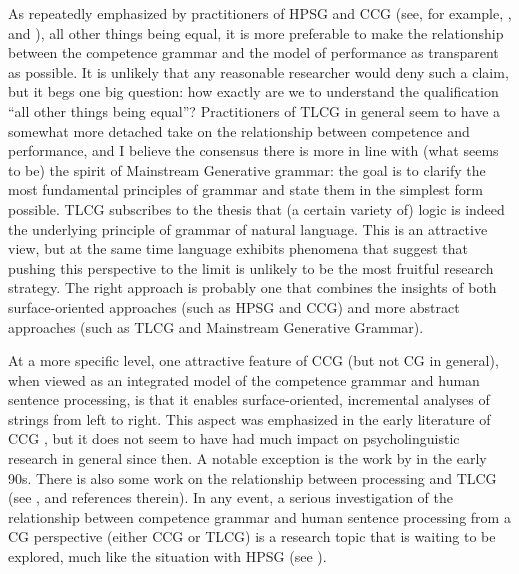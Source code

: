 \documentclass[output=paper,biblatex,babelshorthands,newtxmath,draftmode,colorlinks,citecolor=brown]{langscibook}
\begin{document}
As repeatedly emphasized by practitioners of HPSG and CCG (see, for
example, \citealt{SW2011a}, \citealt[Section~13.7]{steedman2012} and
), all other things being equal, it is more
preferable to make the relationship between the competence grammar and
the model of performance as transparent as possible. It is
unlikely that any reasonable
researcher would deny such a claim, but it begs one big question:
how exactly are we to understand the qualification ``all other things
being equal''? Practitioners of TLCG in general seem to have a somewhat more
detached take on the relationship between competence and performance, 
and I believe the consensus there is more in line with (what seems to be)
the spirit of Mainstream Generative grammar: the goal is to clarify
the most fundamental principles of grammar and state them in the
simplest form possible. TLCG subscribes to the thesis that (a certain
variety of) logic is indeed the underlying principle of grammar of
natural language. This is an attractive view, but at the same time
language exhibits phenomena that suggest that pushing this perspective
to the limit is unlikely to be the most fruitful research strategy. The
right approach is probably one that combines the insights of both 
surface-oriented approaches (such as HPSG and CCG) and more abstract
approaches (such as TLCG and Mainstream Generative Grammar).

At a more specific level, one attractive feature of CCG (but not CG in
general), when viewed as an integrated model of the competence grammar
and human sentence processing, is that it enables surface-oriented,
incremental analyses of strings from left to right. This aspect was
emphasized in the early literature of CCG \citep{AS82a,CS85a}, but it
does not seem to have had much impact on psycholinguistic research in
general since then. A notable exception is the work by
\citet{pickering-barry91,PB93a} in the early 90s. There is also some work
on the relationship between processing and TLCG (see \citealt[Chapters 9 and 10]{morrill2011},
and references therein). In any event, a serious
investigation of the relationship between competence grammar and human
sentence processing from a CG perspective (either CCG or TLCG) is a
research topic that is waiting to be explored, much like the situation
with HPSG (see ).
\end{document}
